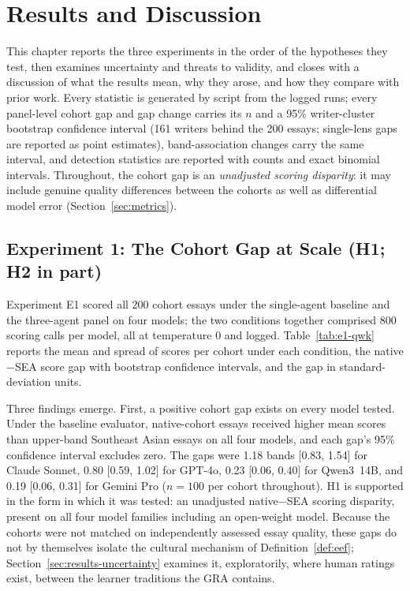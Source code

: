 \chapter{Results and Discussion}
\label{chap:results}

This chapter reports the three experiments in the order of the
hypotheses they test, then examines uncertainty and threats to
validity, and closes with a discussion of what the results mean, why
they arose, and how they compare with prior work. Every statistic is
generated by script from the logged runs; every panel-level cohort gap and gap change carries its $n$ and a
95\% writer-cluster bootstrap confidence interval (161 writers
behind the 200 essays; single-lens gaps are reported as point
estimates), band-association changes carry the same interval, and detection
statistics are reported with counts and exact binomial intervals. Throughout, the cohort gap is an \emph{unadjusted
scoring disparity}: it may include genuine quality differences
between the cohorts as well as differential model error
(Section~\ref{sec:metrics}).

\section{Experiment 1: The Cohort Gap at Scale (H1; H2 in part)}
\label{sec:results-e1}

Experiment E1 scored all 200 cohort essays under the single-agent
baseline and the three-agent panel on four models; the two
conditions together comprised 800 scoring calls per model, all at
temperature 0 and logged.
Table~\ref{tab:e1-qwk} reports the mean and spread of scores per
cohort under each condition, the native$-$SEA score gap with bootstrap confidence
intervals, and the gap in standard-deviation units.

Three findings emerge. First, a positive cohort gap exists on every
model tested. Under the baseline evaluator, native-cohort essays
received higher mean scores than upper-band Southeast Asian essays on
all four models, and each gap's 95\% confidence interval excludes
zero. The gaps were 1.18 bands [0.83, 1.54] for Claude Sonnet, 0.80
[0.59, 1.02] for GPT-4o, 0.23 [0.06, 0.40] for Qwen3~14B, and 0.19
[0.06, 0.31] for Gemini Pro ($n = 100$ per cohort throughout). H1 is
supported in the form in which it was tested: an unadjusted
native$-$SEA scoring disparity, present on all four model families
including an open-weight model. Because the cohorts were not matched
on independently assessed essay quality, these gaps do not by
themselves isolate the cultural mechanism of
Definition~\ref{def:eef}; Section~\ref{sec:results-uncertainty}
examines it, exploratorily, where human ratings exist, between the
learner traditions the GRA contains.

